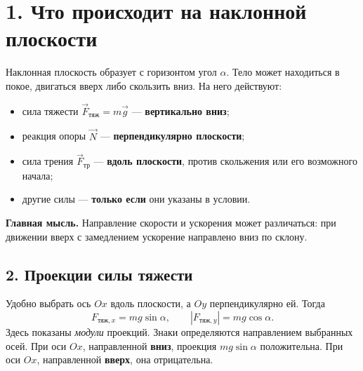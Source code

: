 \documentclass[a4paper,12pt]{article}
\newcommand{\sectionline}[1]{\section*{\textcolor{darkaccent}{#1}}}
\newcommand{\subhead}[1]{\subsection*{\textcolor{darkaccent}{#1}}}
\newcommand{\note}[1]{\textcolor{darkaccent}{\textbf{Главная мысль.}} #1}
\begin{document}
\sectionline{1. Что происходит на наклонной плоскости}
Наклонная плоскость образует с горизонтом угол $\alpha$. Тело может находиться в покое, двигаться вверх либо скользить вниз. На него действуют:
\begin{itemize}
 \item сила тяжести $\vec F_{\text{тяж}}=m\vec g$ — \textbf{вертикально вниз};
 \item реакция опоры $\vec N$ — \textbf{перпендикулярно плоскости};
 \item сила трения $\vec F_{\text{тр}}$ — \textbf{вдоль плоскости}, против скольжения или его возможного начала;
 \item другие силы — \textbf{только если} они указаны в условии.
\end{itemize}
\begin{center}
\end{center}
\note{Направление скорости и ускорения может различаться: при движении вверх с замедлением ускорение направлено вниз по склону.}

\subhead{2. Проекции силы тяжести}
Удобно выбрать ось $Ox$ вдоль плоскости, а $Oy$ перпендикулярно ей. Тогда
\[
\boxed{F_{\text{тяж},x}=mg\sin\alpha,\qquad |F_{\text{тяж},y}|=mg\cos\alpha.}
\]
Здесь показаны \emph{модули} проекций. Знаки определяются направлением выбранных осей. При оси $Ox$, направленной \textbf{вниз}, проекция $mg\sin\alpha$ положительна. При оси $Ox$, направленной \textbf{вверх}, она отрицательна.
\end{document}
